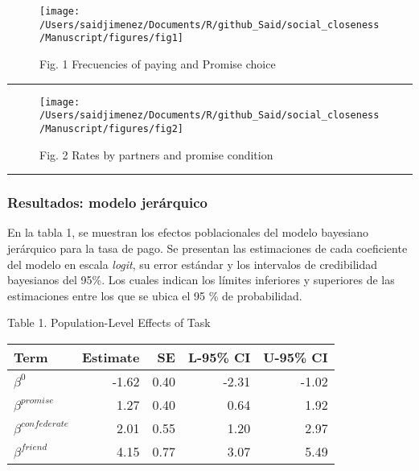 \documentclass[]{article}
\begin{document}
\begin{figure}

{\centering \texttt{[image: /Users/saidjimenez/Documents/R/github\_Said/social\_closeness/Manuscript/figures/fig1]} 

}

\caption{Fig. 1 Frecuencies of paying and Promise choice}\label{fig:fig1}
\end{figure}

\begin{center}\rule{0.5\linewidth}{\linethickness}\end{center}

\begin{figure}

{\centering \texttt{[image: /Users/saidjimenez/Documents/R/github\_Said/social\_closeness/Manuscript/figures/fig2]} 

}

\caption{Fig. 2 Rates by partners and promise condition}\label{fig:fig2}
\end{figure}

\begin{center}\rule{0.5\linewidth}{\linethickness}\end{center}

\subsubsection{Resultados: modelo
jerárquico}\label{resultados-modelo-jerarquico}

En la tabla 1, se muestran los efectos poblacionales del modelo
bayesiano jerárquico para la tasa de pago. Se presentan las estimaciones
de cada coeficiente del modelo en escala \emph{logit}, su error estándar
y los intervalos de credibilidad bayesianos del 95\%. Los cuales indican
los límites inferiores y superiores de las estimaciones entre los que se
ubica el 95 \% de probabilidad.

Table 1. Population-Level Effects of Task

\begin{longtable}[]{@{}lrrrr@{}}
\toprule
Term & Estimate & SE & L-95\% CI & U-95\% CI\tabularnewline
\midrule
\endhead
\(\beta^0\) & -1.62 & 0.40 & -2.31 & -1.02\tabularnewline
\(\beta^{promise}\) & 1.27 & 0.40 & 0.64 & 1.92\tabularnewline
\(\beta^{confederate}\) & 2.01 & 0.55 & 1.20 & 2.97\tabularnewline
\(\beta^{friend}\) & 4.15 & 0.77 & 3.07 & 5.49\tabularnewline
\bottomrule
\end{longtable}
\end{document}
